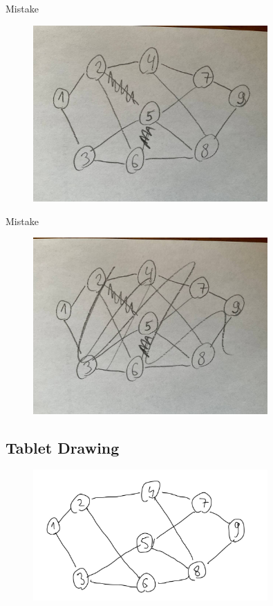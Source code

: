 \documentclass[11pt]{beamer}
\begin{document}
\begin{frame}{\subsecname}{Mistake}
    \begin{figure}
        \centering
        \includegraphics[width=0.8\textwidth]{figures/hand2.jpg}
    \end{figure}
\end{frame}

\begin{frame}{\subsecname}{Mistake}
    \begin{figure}
        \centering
        \includegraphics[width=0.8\textwidth]{figures/hand3.jpg}
    \end{figure}
\end{frame}

\subsection{Tablet Drawing}
\begin{frame}{\subsecname}
    \begin{figure}
        \centering
        \includegraphics[width=0.8\textwidth]{figures/tablet.jpg}
    \end{figure}
\end{frame}
\end{document}
